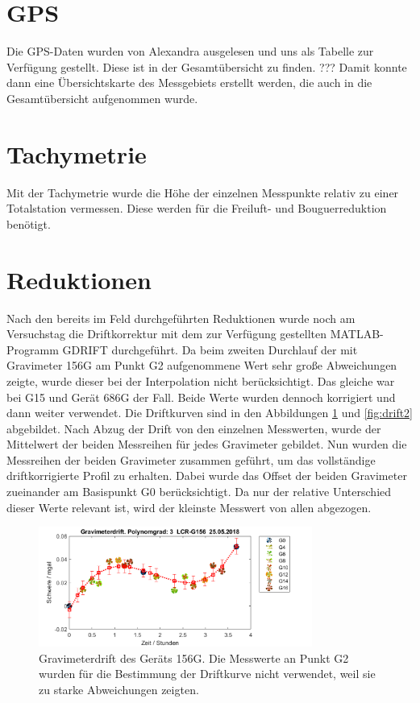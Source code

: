 
\section{GPS}

Die GPS-Daten wurden von Alexandra ausgelesen und uns als Tabelle zur Verfügung gestellt. Diese ist in der Gesamtübersicht zu finden. ??? Damit konnte dann eine Übersichtskarte des Messgebiets erstellt werden, die auch in die Gesamtübersicht aufgenommen wurde.

\section{Tachymetrie}

Mit der Tachymetrie wurde die Höhe der einzelnen Messpunkte relativ zu einer Totalstation vermessen. Diese werden für die Freiluft- und Bouguerreduktion benötigt.


\section{Reduktionen}

Nach den bereits im Feld durchgeführten Reduktionen wurde noch am Versuchstag die Driftkorrektur mit dem zur Verfügung gestellten MATLAB-Programm GDRIFT durchgeführt. Da beim zweiten Durchlauf der mit Gravimeter 156G am Punkt G2 aufgenommene Wert sehr große Abweichungen zeigte, wurde dieser bei der Interpolation nicht berücksichtigt. Das gleiche war bei G15 und Gerät 686G der Fall. Beide Werte wurden dennoch korrigiert und dann weiter verwendet. Die Driftkurven sind in den Abbildungen \ref{fig:drift1} und \ref{fig:drift2} abgebildet. Nach Abzug der Drift von den einzelnen Messwerten, wurde der Mittelwert der beiden Messreihen für jedes Gravimeter gebildet. Nun wurden die Messreihen der beiden Gravimeter zusammen geführt, um das vollständige driftkorrigierte Profil zu erhalten. Dabei wurde das Offset der beiden Gravimeter zueinander am Basispunkt G0 berücksichtigt. Da nur der relative Unterschied dieser Werte relevant ist, wird der kleinste Messwert von allen abgezogen.

\begin{figure}[!ht]
 \centering
 \includegraphics[width=0.8\textwidth]{fig/G156drift_endgultig}
 \caption[Gravimeterdrift des Geräts 156G]{Gravimeterdrift des Geräts 156G. Die Messwerte an Punkt G2 wurden für die Bestimmung der Driftkurve nicht verwendet, weil sie zu starke Abweichungen zeigten.}
 \label{fig:drift1}
\end{figure}

